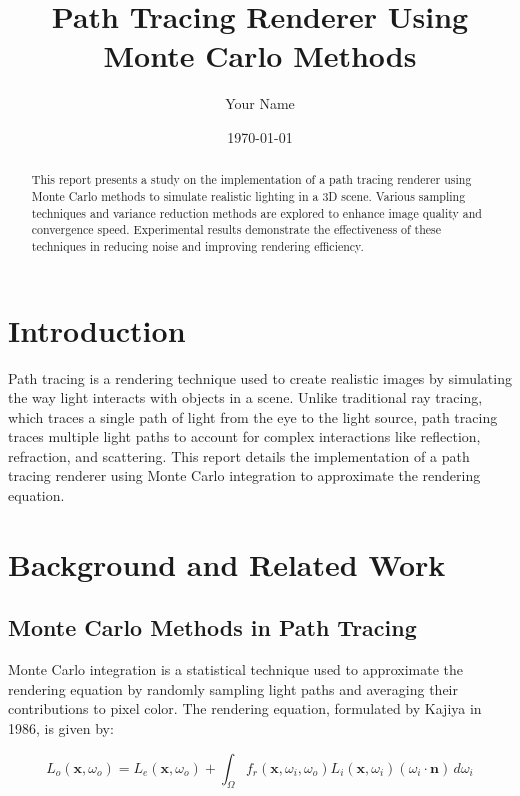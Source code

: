 \documentclass[12pt]{article}
\title{Path Tracing Renderer Using Monte Carlo Methods}
\author{Your Name}
\date{\today}
\begin{document}
\maketitle

\begin{abstract}
    This report presents a study on the implementation of a path tracing renderer using Monte Carlo methods to simulate realistic lighting in a 3D scene. Various sampling techniques and variance reduction methods are explored to enhance image quality and convergence speed. Experimental results demonstrate the effectiveness of these techniques in reducing noise and improving rendering efficiency.
\end{abstract}

\tableofcontents

\section{Introduction}
\label{sec:intro}
Path tracing is a rendering technique used to create realistic images by simulating the way light interacts with objects in a scene. Unlike traditional ray tracing, which traces a single path of light from the eye to the light source, path tracing traces multiple light paths to account for complex interactions like reflection, refraction, and scattering. This report details the implementation of a path tracing renderer using Monte Carlo integration to approximate the rendering equation.

\section{Background and Related Work}
\label{sec:background}
\subsection{Monte Carlo Methods in Path Tracing}
Monte Carlo integration is a statistical technique used to approximate the rendering equation by randomly sampling light paths and averaging their contributions to pixel color. The rendering equation, formulated by Kajiya in 1986, is given by:

\begin{equation}
    L_o(\mathbf{x}, \omega_o) = L_e(\mathbf{x}, \omega_o) + \int_{\Omega} f_r(\mathbf{x}, \omega_i, \omega_o) L_i(\mathbf{x}, \omega_i) (\omega_i \cdot \mathbf{n}) \, d\omega_i
\end{equation}
\end{document}
